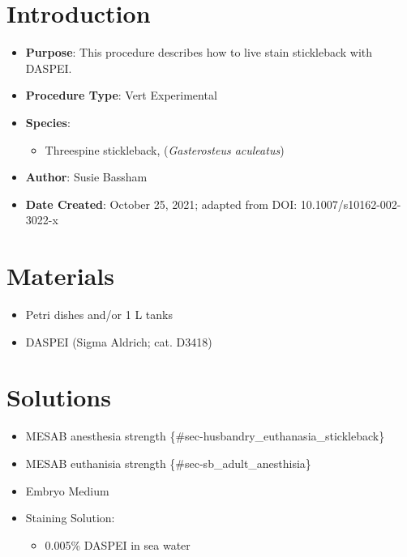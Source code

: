 \documentclass[
  letterpaper,
  DIV=11,
  numbers=noendperiod]{scrreprt}
\providecommand{\tightlist}{%
  \setlength{\itemsep}{0pt}\setlength{\parskip}{0pt}}\usepackage{longtable,booktabs,array}
\begin{document}
\hypertarget{introduction-79}{%
\section{Introduction}\label{introduction-79}}

\begin{itemize}
\tightlist
\item
  \textbf{Purpose}: This procedure describes how to live stain
  stickleback with DASPEI.
\item
  \textbf{Procedure Type}: Vert Experimental
\item
  \textbf{Species}:

  \begin{itemize}
  \tightlist
  \item
    Threespine stickleback, (\emph{Gasterosteus aculeatus})
  \end{itemize}
\item
  \textbf{Author}: Susie Bassham
\item
  \textbf{Date Created}: October 25, 2021; adapted from DOI:
  10.1007/s10162-002-3022-x
\end{itemize}

\hypertarget{materials-75}{%
\section{Materials}\label{materials-75}}

\begin{itemize}
\tightlist
\item
  Petri dishes and/or 1 L tanks
\item
  DASPEI (Sigma Aldrich; cat. D3418)
\end{itemize}

\hypertarget{solutions-67}{%
\section{Solutions}\label{solutions-67}}

\begin{itemize}
\tightlist
\item
  MESAB anesthesia strength \{\#sec-husbandry\_euthanasia\_stickleback\}
\item
  MESAB euthanisia strength \{\#sec-sb\_adult\_anesthisia\}
\item
  Embryo Medium\\
\item
  Staining Solution:

  \begin{itemize}
  \tightlist
  \item
    0.005\% DASPEI in sea water
  \end{itemize}
\end{itemize}
\end{document}
